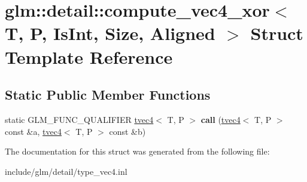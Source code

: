 \hypertarget{structglm_1_1detail_1_1compute__vec4__xor}{}\section{glm\+:\+:detail\+:\+:compute\+\_\+vec4\+\_\+xor$<$ T, P, Is\+Int, Size, Aligned $>$ Struct Template Reference}
\label{structglm_1_1detail_1_1compute__vec4__xor}
\subsection*{Static Public Member Functions}
\begin{DoxyCompactItemize}
\item 
\mbox{\label{structglm_1_1detail_1_1compute__vec4__xor_a02bcddb2853aa0fdbd6c54bf9cb40df6}} 
static G\+L\+M\+\_\+\+F\+U\+N\+C\+\_\+\+Q\+U\+A\+L\+I\+F\+I\+ER \hyperlink{structglm_1_1tvec4}{tvec4}$<$ T, P $>$ {\bfseries call} (\hyperlink{structglm_1_1tvec4}{tvec4}$<$ T, P $>$ const \&a, \hyperlink{structglm_1_1tvec4}{tvec4}$<$ T, P $>$ const \&b)
\end{DoxyCompactItemize}


The documentation for this struct was generated from the following file\+:\begin{DoxyCompactItemize}
\item 
include/glm/detail/type\+\_\+vec4.\+inl\end{DoxyCompactItemize}

